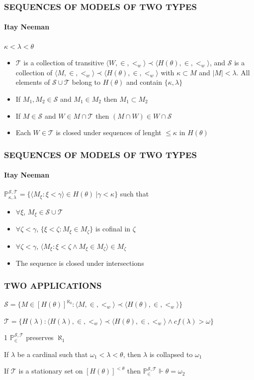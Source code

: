 \documentclass[10pt]{beamer}
\begin{document}
\begin{frame}
\frametitle{SEQUENCES OF MODELS OF TWO TYPES}
\framesubtitle{Itay Neeman}
$\kappa < \lambda < \theta$
\begin{itemize}
\item $\mathcal{T}$ is a collection of transitive $\langle W, \in, <_w \rangle \prec \langle H(\theta), \in, <_w \rangle$, and $\mathcal{S}$ is a collection of $\langle M, \in, <_w \rangle \prec \langle H(\theta), \in, <_w \rangle$ with $\kappa \subset M$ and $|M| < \lambda$. All elements of $\mathcal{S} \cup \mathcal{T}$ belong to $H(\theta)$ and contain $\{\kappa, \lambda\}$
\item If $M_1, M_2 \in \mathcal{S}$ and $M_1 \in M_2$ then $M_1 \subset M_2$
\item If $M \in \mathcal{S}$ and $W \in M \cap \mathcal{T}$ then $(M \cap W) \in W \cap \mathcal{S}$
\item Each $W \in \mathcal{T}$ is closed under sequences of lenght $\leq \kappa$ in $H(\theta)$
\end{itemize}
\end{frame}
\begin{frame}
\frametitle{SEQUENCES OF MODELS OF TWO TYPES}
\framesubtitle{Itay Neeman}
\begin{block}{}
$\mathbb{P}_{\kappa, \lambda}^{\mathcal{S}, \mathcal{T}}= \{ \langle M_{\xi} : \xi < \gamma \rangle \in H(\theta) \ | \gamma < \kappa \}$
such that
\begin{itemize}
\item $\forall\xi$, $M_{\xi} \in \mathcal{S} \cup \mathcal{T}$
\item $\forall \zeta < \gamma$, $\{\xi < \zeta : M_{\xi} \in M_{\zeta}\}$ is cofinal in $\zeta$
\item $\forall \zeta < \gamma$, $\langle M_{\xi} : \xi < \zeta \land M_{\xi} \in M_{\zeta} \rangle \in M_{\zeta}$
\item The sequence is closed under intersections
\end{itemize}
\end{block}
\end{frame}
\begin{frame}
\frametitle{TWO APPLICATIONS}
$\mathcal{S}= \{M \in [H(\theta)]^{\aleph_0} : \langle M, \in, <_w \rangle \prec \langle H(\theta), \in, <_w \rangle \}$

$\mathcal{T}= \{H(\lambda) : \langle H(\lambda), \in, <_w \rangle \prec \langle H(\theta), \in, <_w \rangle \land cf(\lambda) > \omega \}$
\begin{block}{1}
$\mathbb{P}_{\in}^{\mathcal{S}, \mathcal{T}}$ preserves $\aleph_1$

If $\lambda$ be a cardinal such that $\omega_1 < \lambda < \theta$, then $\lambda$ is collapsed to $\omega_1$

If $\mathcal{T}$ is a stationary set on $[H(\theta)]^{<\theta}$ then $\mathbb{P}_{\in}^{\mathcal{S}, \mathcal{T}} \Vdash \theta=\omega_2$
\end{block}
\end{frame}
\end{document}
